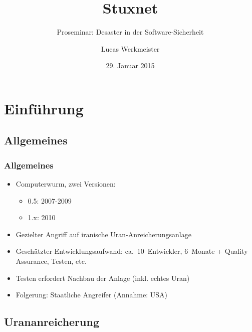 \documentclass{beamer}
\title{Stuxnet}
\subtitle{Proseminar: Desaster in der Software-Sicherheit}
\author{Lucas Werkmeister}
\date{29. Januar 2015}
\begin{document}
\begin{frame}
  \titlepage
\end{frame}


\section{Einführung}

\subsection{Allgemeines}

\begin{frame}
  \frametitle{Allgemeines}
  \begin{itemize}
    \item Computerwurm, zwei Versionen:
      \begin{itemize}
        \item 0.5: 2007-2009
        \item 1.x: 2010
      \end{itemize}
    \item Gezielter Angriff auf iranische Uran-Anreicherungsanlage
    \item Geschätzter Entwicklungsaufwand: ca.~10~Entwickler, 6~Monate + Quality Assurance, Testen, etc.
    \item Testen erfordert Nachbau der Anlage (inkl. echtes Uran)
    \item Folgerung: Staatliche Angreifer (Annahme: USA)
  \end{itemize}
\end{frame}

\subsection{Urananreicherung}
\end{document}
